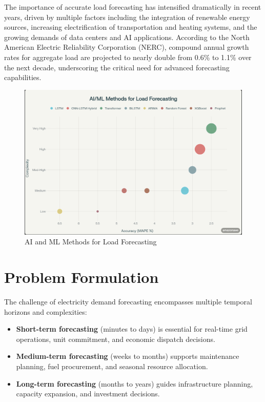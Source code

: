 \documentclass[12pt,a4paper]{report}
\begin{document}
The importance of accurate load forecasting has intensified dramatically in recent years, driven by multiple factors including the integration of renewable energy sources, increasing electrification of transportation and heating systems, and the growing demands of data centers and AI applications. According to the North American Electric Reliability Corporation (NERC), compound annual growth rates for aggregate load are projected to nearly double from 0.6\% to 1.1\% over the next decade, underscoring the critical need for advanced forecasting capabilities.

\begin{figure}[H]
    \centering
    \includegraphics[scale=0.5]{assets/ai_ml_methods_model_load_forecasting.png}
    \caption{AI and ML Methods for Load Forecasting}
    \label{fig:ai_ml_methods}
\end{figure}


\section{Problem Formulation}
The challenge of electricity demand forecasting encompasses multiple temporal horizons and complexities:

\begin{itemize}
\item \textbf{Short-term forecasting} (minutes to days) is essential for real-time grid operations, unit commitment, and economic dispatch decisions.
\item \textbf{Medium-term forecasting} (weeks to months) supports maintenance planning, fuel procurement, and seasonal resource allocation.
\item \textbf{Long-term forecasting} (months to years) guides infrastructure planning, capacity expansion, and investment decisions.
\end{itemize}
\end{document}
